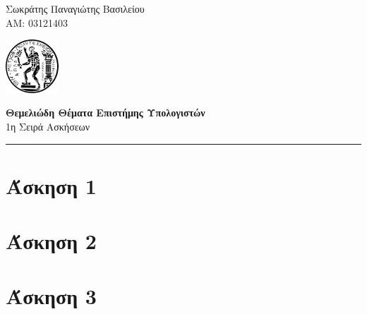 \documentclass[11pt,letterpaper]{article}
\begin{document}
\pagestyle{plain}

\begin{flushleft}
Σωκράτης Παναγιώτης Βασιλείου\\
ΑΜ: 03121403
\end{flushleft}

\begin{flushright}\vspace{-15mm}
\includegraphics[height=2cm]{ntua_logo.png}
\end{flushright}
 
\begin{center}\vspace{-1cm}
\textbf{\large Θεμελιώδη Θέματα Επιστήμης Υπολογιστών}\\
1η Σειρά Ασκήσεων
\end{center}

 
\rule{\linewidth}{0.1mm}

\bigskip

\section*{Άσκηση 1}
\section*{Άσκηση 2}
\section*{Άσκηση 3}
\end{document}
